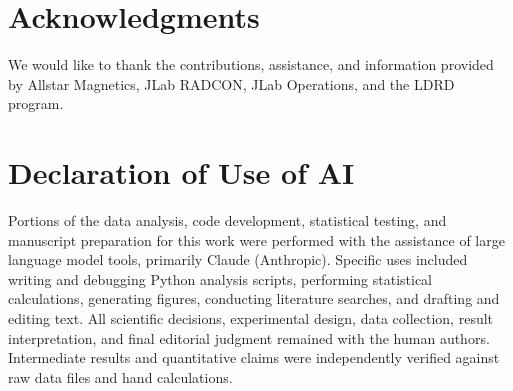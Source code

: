 \documentclass[11pt,letterpaper]{article}
\begin{document}
\section*{Acknowledgments}

We would like to thank the contributions, assistance, and information provided by Allstar Magnetics, JLab RADCON, JLab Operations, and the LDRD program.


\section*{Declaration of Use of AI}
Portions of the data analysis, code development, statistical testing, and manuscript preparation for this work were performed with the assistance of large language model tools, primarily Claude (Anthropic). Specific uses included writing and debugging Python analysis scripts, performing statistical calculations, generating figures, conducting literature searches, and drafting and editing text. All scientific decisions, experimental design, data collection, result interpretation, and final editorial judgment remained with the human authors. Intermediate results and quantitative claims were independently verified against raw data files and hand calculations.
\newpage
\end{document}

